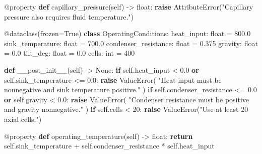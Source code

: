 \documentclass[
  12pt,
  12pt,a4paper,oneside]{report}
\newenvironment{Shaded}{}{}
\newcommand{\AttributeTok}[1]{\textcolor[rgb]{0.49,0.56,0.16}{#1}}
\newcommand{\BuiltInTok}[1]{\textcolor[rgb]{0.00,0.50,0.00}{#1}}
\newcommand{\ControlFlowTok}[1]{\textcolor[rgb]{0.00,0.44,0.13}{\textbf{#1}}}
\newcommand{\DecValTok}[1]{\textcolor[rgb]{0.25,0.63,0.44}{#1}}
\newcommand{\FloatTok}[1]{\textcolor[rgb]{0.25,0.63,0.44}{#1}}
\newcommand{\KeywordTok}[1]{\textcolor[rgb]{0.00,0.44,0.13}{\textbf{#1}}}
\newcommand{\NormalTok}[1]{#1}
\newcommand{\OperatorTok}[1]{\textcolor[rgb]{0.40,0.40,0.40}{#1}}
\newcommand{\PreprocessorTok}[1]{\textcolor[rgb]{0.74,0.48,0.00}{#1}}
\newcommand{\StringTok}[1]{\textcolor[rgb]{0.25,0.44,0.63}{#1}}
\newcommand{\VariableTok}[1]{\textcolor[rgb]{0.10,0.09,0.49}{#1}}
\begin{document}
\begin{Shaded}
\begin{Highlighting}[]
    \AttributeTok{@property}
    \KeywordTok{def}\NormalTok{ capillary\_pressure(}\VariableTok{self}\NormalTok{) }\OperatorTok{{-}\textgreater{}} \BuiltInTok{float}\NormalTok{:}
        \ControlFlowTok{raise} \PreprocessorTok{AttributeError}\NormalTok{(}\StringTok{"Capillary pressure also requires fluid temperature."}\NormalTok{)}


\AttributeTok{@dataclass}\NormalTok{(frozen}\OperatorTok{=}\VariableTok{True}\NormalTok{)}
\KeywordTok{class}\NormalTok{ OperatingConditions:}
\NormalTok{    heat\_input: }\BuiltInTok{float} \OperatorTok{=} \FloatTok{800.0}
\NormalTok{    sink\_temperature: }\BuiltInTok{float} \OperatorTok{=} \FloatTok{700.0}
\NormalTok{    condenser\_resistance: }\BuiltInTok{float} \OperatorTok{=} \FloatTok{0.375}
\NormalTok{    gravity: }\BuiltInTok{float} \OperatorTok{=} \FloatTok{0.0}
\NormalTok{    tilt\_deg: }\BuiltInTok{float} \OperatorTok{=} \FloatTok{0.0}
\NormalTok{    cells: }\BuiltInTok{int} \OperatorTok{=} \DecValTok{400}

    \KeywordTok{def}\NormalTok{ \_\_post\_init\_\_(}\VariableTok{self}\NormalTok{) }\OperatorTok{{-}\textgreater{}} \VariableTok{None}\NormalTok{:}
        \ControlFlowTok{if} \VariableTok{self}\NormalTok{.heat\_input }\OperatorTok{\textless{}} \FloatTok{0.0} \KeywordTok{or} \VariableTok{self}\NormalTok{.sink\_temperature }\OperatorTok{\textless{}=} \FloatTok{0.0}\NormalTok{:}
            \ControlFlowTok{raise} \PreprocessorTok{ValueError}\NormalTok{(}
                \StringTok{"Heat input must be nonnegative and sink temperature positive."}
\NormalTok{            )}
        \ControlFlowTok{if} \VariableTok{self}\NormalTok{.condenser\_resistance }\OperatorTok{\textless{}=} \FloatTok{0.0} \KeywordTok{or} \VariableTok{self}\NormalTok{.gravity }\OperatorTok{\textless{}} \FloatTok{0.0}\NormalTok{:}
            \ControlFlowTok{raise} \PreprocessorTok{ValueError}\NormalTok{(}
                \StringTok{"Condenser resistance must be positive and gravity nonnegative."}
\NormalTok{            )}
        \ControlFlowTok{if} \VariableTok{self}\NormalTok{.cells }\OperatorTok{\textless{}} \DecValTok{20}\NormalTok{:}
            \ControlFlowTok{raise} \PreprocessorTok{ValueError}\NormalTok{(}\StringTok{"Use at least 20 axial cells."}\NormalTok{)}

    \AttributeTok{@property}
    \KeywordTok{def}\NormalTok{ operating\_temperature(}\VariableTok{self}\NormalTok{) }\OperatorTok{{-}\textgreater{}} \BuiltInTok{float}\NormalTok{:}
        \ControlFlowTok{return} \VariableTok{self}\NormalTok{.sink\_temperature }\OperatorTok{+} \VariableTok{self}\NormalTok{.condenser\_resistance }\OperatorTok{*} \VariableTok{self}\NormalTok{.heat\_input}



\end{Highlighting}
\end{Shaded}
\end{document}
